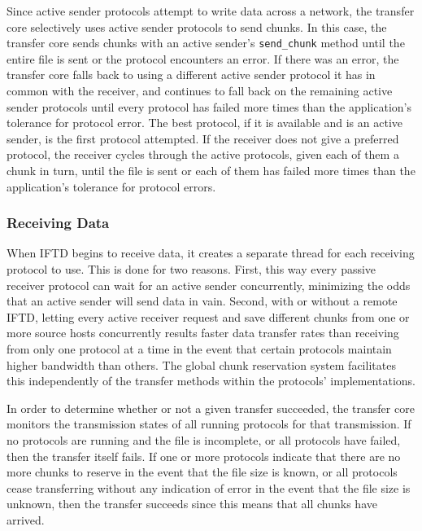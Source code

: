 Since active sender protocols attempt to write data across a network, the transfer core selectively uses active sender protocols to send chunks.  In this case, the transfer core sends chunks with an active sender's \texttt{send\_chunk} method until the entire file is sent or the protocol encounters an error.  If there was an error, the transfer core falls back to using a different active sender protocol it has in common with the receiver, and continues to fall back on the remaining active sender protocols until every protocol has failed more times than the application's tolerance for protocol error.  The best protocol, if it is available and is an active sender, is the first protocol attempted.  If the receiver does not give a preferred protocol, the receiver cycles through the active protocols, given each of them a chunk in turn, until the file is sent or each of them has failed more times than the application's tolerance for protocol errors.

\subsubsection{Receiving Data}

When IFTD begins to receive data, it creates a separate thread for each receiving protocol to use.  This is done for two reasons.  First, this way every passive receiver protocol can wait for an active sender concurrently, minimizing the odds that an active sender will send data in vain.  Second, with or without a remote IFTD, letting every active receiver request and save different chunks from one or more source hosts concurrently results faster data transfer rates than receiving from only one protocol at a time in the event that certain protocols maintain higher bandwidth than others.  The global chunk reservation system facilitates this independently of the transfer methods within the protocols' implementations.

In order to determine whether or not a given transfer succeeded, the transfer core monitors the transmission states of all running protocols for that transmission.  If no protocols are running and the file is incomplete, or all protocols have failed, then the transfer itself fails.  If one or more protocols indicate that there are no more chunks to reserve in the event that the file size is known, or all protocols cease transferring without any indication of error in the event that the file size is unknown, then the transfer succeeds since this means that all chunks have arrived.

